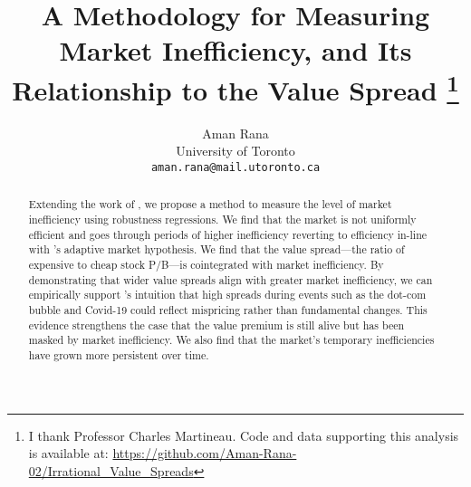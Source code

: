 \documentclass[11pt,a4paper,english]{article}
\date{\displaydate{date}}
\title{A Methodology for Measuring Market Inefficiency, and Its Relationship to the Value Spread 
\thanks{I thank Professor Charles Martineau. Code and data supporting this analysis is available at: \url{https://github.com/Aman-Rana-02/Irrational_Value_Spreads}}}
\author{%
  Aman Rana\\
  \small University of Toronto\\
  \small\texttt{aman.rana@mail.utoronto.ca}
}
\begin{document}
  \maketitle

  \begin{abstract}
    \noindent Extending the work of \citep{boguth_2023}, we propose a method to measure the level of market inefficiency using robustness regressions.
    We find that the market is not uniformly efficient and goes through periods of higher inefficiency reverting to efficiency in-line with \cite{lo_amh}'s adaptive 
    market hypothesis. We find that the value spread—the ratio of expensive to cheap stock P/B—is cointegrated with market inefficiency. 
    By demonstrating that wider value spreads align with greater market inefficiency, we can empirically support \citet{asness_2024}'s intuition 
    that high spreads during events such as the dot-com bubble and Covid-19 could reflect mispricing rather than fundamental changes. 
    This evidence strengthens the case that the value premium is still alive but has been masked by market inefficiency. 
    We also find that the market's temporary inefficiencies have grown more persistent over time.
  \end{abstract}

  \newpage
  \tableofcontents

  \newpage
  

  \newpage
  

  
  
  \newpage
  

  \newpage
  

  \newpage
  

  \newpage
  
  
\end{document}
